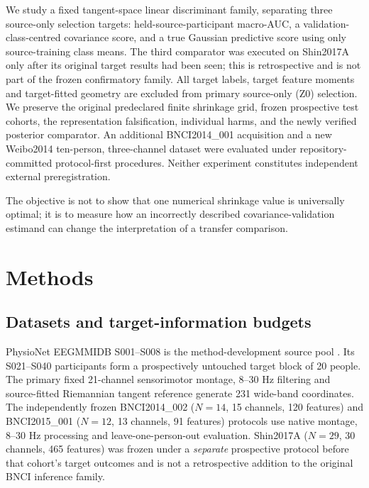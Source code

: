 \documentclass[11pt,a4paper]{article}
\begin{document}
We study a fixed tangent-space linear discriminant family, separating
three source-only selection targets: held-source-participant
macro-AUC, a validation-class-centred covariance score, and a true
Gaussian predictive score using only source-training class means.
The third comparator was executed on Shin2017A only after its original
target results had been seen; this is retrospective and is not part of
the frozen confirmatory family. All target labels, target feature
moments and target-fitted geometry are excluded from primary source-only
(Z0) selection. We preserve the original predeclared finite shrinkage grid,
frozen prospective test cohorts, the representation falsification,
individual harms, and the newly verified posterior comparator. An additional BNCI2014\_001 acquisition and a new Weibo2014
ten-person, three-channel dataset were evaluated under
repository-committed protocol-first procedures. Neither experiment
constitutes independent external preregistration.

The objective is not to show
that one numerical shrinkage value is universally optimal; it is to measure
how an incorrectly described covariance-validation estimand can change
the interpretation of a transfer comparison.




\section{Methods}
\subsection{Datasets and target-information budgets}
PhysioNet EEGMMIDB S001--S008 is the method-development source pool
\cite{schalk2009eegmmidb,schalk2004bci2000}.
Its S021--S040 participants form a prospectively untouched target block
of 20 people. The primary fixed 21-channel sensorimotor montage, 8--30 Hz
filtering and source-fitted Riemannian tangent reference generate 231
wide-band coordinates. The independently frozen BNCI2014\_002
(\(N=14\), 15 channels, 120 features) and BNCI2015\_001
(\(N=12\), 13 channels, 91 features) protocols use native montage,
8--30 Hz processing and leave-one-person-out evaluation. Shin2017A
(\(N=29\), 30 channels, 465 features) was frozen under a \emph{separate}
prospective protocol before that cohort's target outcomes and is not a
retrospective addition to the original BNCI inference family.
\end{document}
